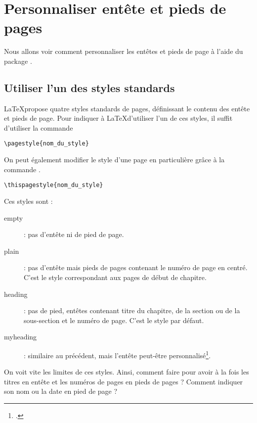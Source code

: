 \chapter{Personnaliser entête et pieds de pages}\label{entete}

\begin{prealable}
Nous allons voir comment personnaliser les entêtes et pieds de page à l'aide du package .
\end{prealable}


\section{Utiliser l'un des styles standards}\label{stylesentete}

\LaTeX propose quatre styles standards de pages, définissant le contenu des entête et pieds de page. Pour indiquer à \LaTeX d'utiliser l'un de ces styles, il suffit d'utiliser la commande 
\begin{verbatim}
\pagestyle{nom_du_style}
\end{verbatim} 

On peut également modifier le style d'une page en particulière grâce à la commande .

\begin{verbatim}
\thispagestyle{nom_du_style}
\end{verbatim} 

Ces styles sont :
\begin{description}
\item[empty]: pas d'entête ni de pied de page.
\item[plain]: pas d'entête mais pieds de pages contenant le numéro de page en centré. C'est le style correspondant aux pages de début de chapitre. 
\item[heading]: pas de pied, entêtes contenant titre du chapitre, de la section ou de la sous-section et le numéro de page. C'est le style par défaut. \label{styleentetes}
\item[myheading]: similaire au précédent, mais l'entête peut-être personnalisé\footcite[Nous tenons cette information du][\pno~222, qui ne précise pas comment faire]{latex_companion}.
\end{description}



On voit vite les limites de ces styles. Ainsi, comment faire pour avoir à la fois les titres en entête et les numéros de pages en pieds de pages ? Comment indiquer son nom ou la date en pied de page ?

